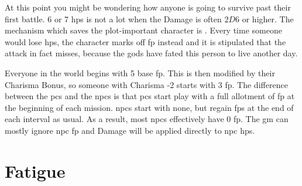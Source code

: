 \begin{multicols}{2}

\noindent

At this point you might be wondering how anyone is going to survive past their first battle.
6 or 7 \glspl{hp} is not a lot when the Damage is often $2D6$ or higher.
The mechanism which saves the plot-important character is .
Every time someone would lose \glspl{hp}, the character marks off \gls{fp} instead and it is stipulated that the attack in fact misses, because the gods have fated this person to live another day.

Everyone in the world begins with 5 base \gls{fp}.
This is then modified by their Charisma Bonus, so someone with Charisma -2 starts with 3 \gls{fp}.
The difference between the \glspl{pc} and the \glspl{npc} is that \glspl{pc} start play with a full allotment of \gls{fp} at the beginning of each mission.
\Glspl{npc} start with none, but regain \glspl{fp} at the end of each interval as usual.
As a result, most \glspl{npc} effectively have 0 \gls{fp}.
The \gls{gm} can mostly ignore \gls{npc} \gls{fp} and Damage will be applied directly to \gls{npc} \glspl{hp}.

\end{multicols}

\section{Fatigue}

